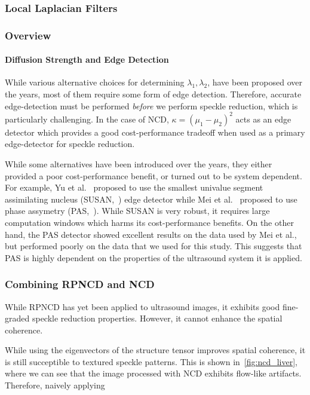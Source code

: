 \subsubsection{Local Laplacian Filters}

\cite{10.1145/2010324.1964963}


\subsubsection{Overview}


\paragraph{Diffusion Strength and Edge Detection}
While various alternative choices for determining \(\lambda_1, \lambda_2\), have been proposed over the years, most of them require some form of edge detection.
Therefore, accurate edge-detection must be performed \textit{before} we perform speckle reduction, which is particularly challenging.
In the case of NCD, \(\kappa = {(\mu_1 - \mu_2)}^2\) acts as an edge detector which provides a good cost-performance tradeoff when used as a primary edge-detector for speckle reduction.

While some alternatives have been introduced over the years, they either provided a poor cost-performance benefit, or turned out to be system dependent.
For example, Yu et al.~\cite{yu_ultrasound_2010} proposed to use the smallest univalue segment assimilating nucleus (SUSAN,~\cite{smith_susan_1997}) edge detector while Mei et al.~\cite{mei_phase_2020} proposed to use phase assymetry (PAS,~\cite{kovesi_image_1999}).
While SUSAN is very robust, it requires large computation windows which harms its cost-performance benefits.
On the other hand, the PAS detector showed excellent results on the data used by Mei et al., but performed poorly on the data that we used for this study.
This suggests that PAS is highly dependent on the properties of the ultrasound system it is applied.


\subsubsection{Combining RPNCD and NCD}
While RPNCD has yet been applied to ultrasound images, it exhibits good fine-graded speckle reduction properties.
However, it cannot enhance the spatial coherence.


While using the eigenvectors of the structure tensor improves spatial coherence, it is still succeptible to textured speckle patterns.
This is shown in~\cref{fig:ncd_liver}, where we can see that the image processed with NCD exhibits flow-like artifacts.
Therefore, naively applying 

